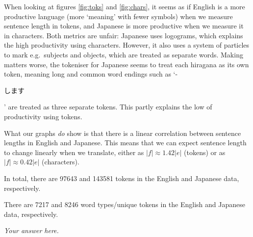 \documentclass[answers]{exam}
\begin{document}
\begin{questions}
\begin{framed}
\begin{compactenum}[1.]
	\item
    When looking at figures \ref{fig:toks} and \ref{fig:chars}, it seems as if
    English is a more productive language (more `meaning' with fewer symbols)
    when we measure sentence length in tokens, and Japanese is more productive
    when we measure it in characters. 
    Both metrics are unfair: Japanese uses logograms, which explains the
    high productivity using characters. However, it also uses a system of
    particles to mark e.g.\ subjects and objects, which are treated as separate
    words. Making matters worse, the tokeniser for Japanese seems to treat each
    hiragana as its own token, meaning long and common word endings such as
    `-\begin{CJK}{UTF8}{min}します\end{CJK}' are treated as three separate
    tokens. This partly explains the low of productivity using tokens.
    
    What our graphs \emph{do} show is that there is a linear correlation between
    sentence lengths in English and Japanese. This means that we can expect
    sentence length to change linearly when we translate, either as $|f| \approx
    1.42|e|$ (tokens) or as $|f| \approx 0.42|e|$ (characters). 
  \item
    In total, there are 97643 and 143581 tokens in the English and Japanese
    data, respectively.
  \item
    There are 7217 and 8246 word types/unique tokens in the English and Japanese
    data, respectively.
  \item
  \item
  \item
\end{compactenum}
\end{framed}


\begin{framed}
\emph{Your answer here.}
\end{framed}


\begin{framed}
\begin{compactenum}[1.]
	\item
    \item
    \item
\end{compactenum}
\end{framed}



\end{questions}
\end{document}
